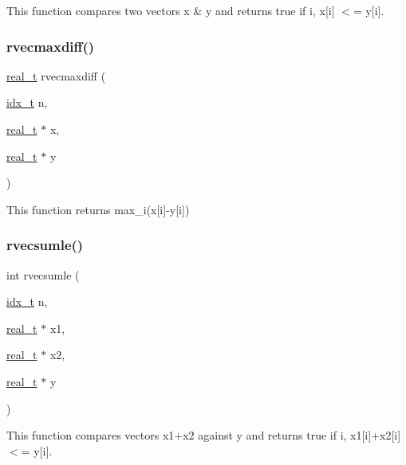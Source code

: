 This function compares two vectors x \& y and returns true if  i, x\mbox{[}i\mbox{]} $<$= y\mbox{[}i\mbox{]}. \mbox{\label{a00945_ad9d0577add9657973cd37030daf3eb1e}} 
\subsubsection{\texorpdfstring{rvecmaxdiff()}{rvecmaxdiff()}}
{\footnotesize\ttfamily \hyperlink{a00876_a1924a4f6907cc3833213aba1f07fcbe9}{real\+\_\+t} rvecmaxdiff (\begin{DoxyParamCaption}\item[{\hyperlink{a00876_aaa5262be3e700770163401acb0150f52}{idx\+\_\+t}}]{n,  }\item[{\hyperlink{a00876_a1924a4f6907cc3833213aba1f07fcbe9}{real\+\_\+t} $\ast$}]{x,  }\item[{\hyperlink{a00876_a1924a4f6907cc3833213aba1f07fcbe9}{real\+\_\+t} $\ast$}]{y }\end{DoxyParamCaption})}

This function returns max\+\_\+i(x\mbox{[}i\mbox{]}-\/y\mbox{[}i\mbox{]}) \mbox{\label{a00945_a28bf91b2a028cd146d6961a11252c2b8}} 
\subsubsection{\texorpdfstring{rvecsumle()}{rvecsumle()}}
{\footnotesize\ttfamily int rvecsumle (\begin{DoxyParamCaption}\item[{\hyperlink{a00876_aaa5262be3e700770163401acb0150f52}{idx\+\_\+t}}]{n,  }\item[{\hyperlink{a00876_a1924a4f6907cc3833213aba1f07fcbe9}{real\+\_\+t} $\ast$}]{x1,  }\item[{\hyperlink{a00876_a1924a4f6907cc3833213aba1f07fcbe9}{real\+\_\+t} $\ast$}]{x2,  }\item[{\hyperlink{a00876_a1924a4f6907cc3833213aba1f07fcbe9}{real\+\_\+t} $\ast$}]{y }\end{DoxyParamCaption})}

This function compares vectors x1+x2 against y and returns true if  i, x1\mbox{[}i\mbox{]}+x2\mbox{[}i\mbox{]} $<$= y\mbox{[}i\mbox{]}. \mbox{\label{a00945_a8fbf14fa1b6600107eb5a03c655e50a4}} 
